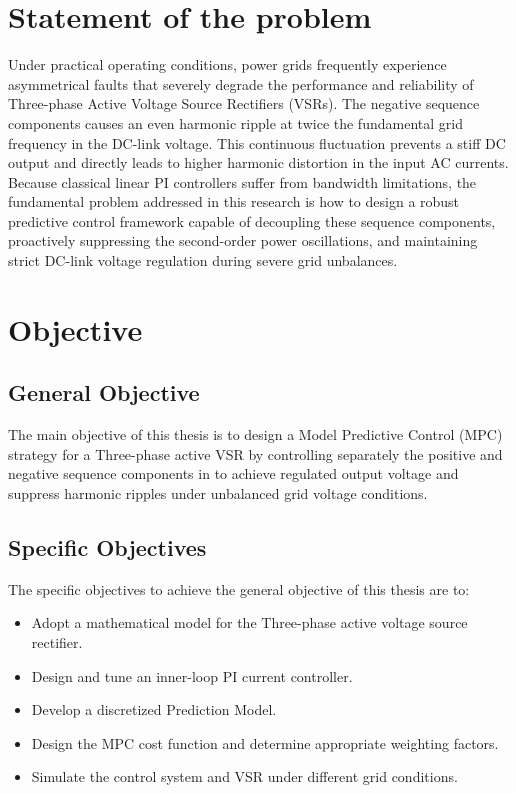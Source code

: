 \section{Statement of the problem}
Under practical operating conditions, power grids frequently experience asymmetrical faults that severely degrade the performance
and reliability of Three-phase Active Voltage Source Rectifiers (VSRs). The negative sequence components causes an even harmonic 
ripple at twice the fundamental grid frequency in the DC-link voltage. This continuous fluctuation prevents a stiff 
DC output and directly leads to higher harmonic distortion in the input AC currents. Because classical linear PI controllers suffer
from bandwidth limitations, the fundamental problem addressed in this research is how to design a robust predictive control framework
capable of decoupling these sequence components, proactively suppressing the second-order power oscillations, and maintaining strict
DC-link voltage regulation during severe grid unbalances.\par
\section{Objective}
\subsection{General Objective}
The main objective of this thesis is to design a Model Predictive Control (MPC) strategy for a Three-phase active VSR by controlling
separately the positive and negative sequence components in to achieve regulated output voltage and suppress harmonic ripples under
unbalanced grid voltage conditions. 
\subsection{Specific Objectives}
The specific objectives to achieve the general objective of this thesis are to:
\begin{itemize}
    \item Adopt a mathematical model for the Three-phase active voltage source rectifier.
    \item Design and tune an inner-loop PI current controller.
    \item Develop a discretized Prediction Model.
    \item Design the MPC cost function and determine appropriate weighting factors.
    \item Simulate the control system and VSR under different grid conditions.
\end{itemize}
